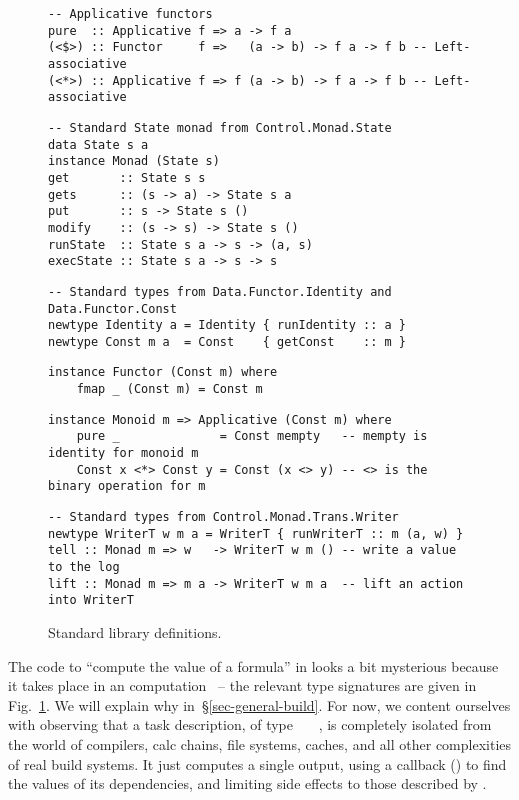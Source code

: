 \begin{figure}
\begin{verbatim}
-- Applicative functors
pure  :: Applicative f => a -> f a
(<$>) :: Functor     f =>   (a -> b) -> f a -> f b -- Left-associative
(<*>) :: Applicative f => f (a -> b) -> f a -> f b -- Left-associative
\end{verbatim}
\vspace{0.5mm}
\begin{verbatim}
-- Standard State monad from Control.Monad.State
data State s a
instance Monad (State s)
get       :: State s s
gets      :: (s -> a) -> State s a
put       :: s -> State s ()
modify    :: (s -> s) -> State s ()
runState  :: State s a -> s -> (a, s)
execState :: State s a -> s -> s
\end{verbatim}
\vspace{0.5mm}
\begin{verbatim}
-- Standard types from Data.Functor.Identity and Data.Functor.Const
newtype Identity a = Identity { runIdentity :: a }
newtype Const m a  = Const    { getConst    :: m }
\end{verbatim}
\vspace{0.5mm}
\begin{verbatim}
instance Functor (Const m) where
    fmap _ (Const m) = Const m
\end{verbatim}
\vspace{0.5mm}
\begin{verbatim}
instance Monoid m => Applicative (Const m) where
    pure _              = Const mempty   -- mempty is identity for monoid m
    Const x <*> Const y = Const (x <> y) -- <> is the binary operation for m
\end{verbatim}
\vspace{0.5mm}
\begin{verbatim}
-- Standard types from Control.Monad.Trans.Writer
newtype WriterT w m a = WriterT { runWriterT :: m (a, w) }
tell :: Monad m => w   -> WriterT w m () -- write a value to the log
lift :: Monad m => m a -> WriterT w m a  -- lift an action into WriterT
\end{verbatim}
\caption{Standard library definitions.}\label{fig-stdlib}
\end{figure}

The code to ``compute the value of a formula'' in  looks a bit
mysterious because it takes place in an 
computation~\cite{mcbride2008applicative} -- the relevant type signatures are
given in Fig.~\ref{fig-stdlib}. We will explain why in~\S\ref{sec-general-build}.
For now, we content ourselves with observing that a task description, of type
~~~, is completely isolated from the world of
compilers, calc chains, file systems, caches, and all other complexities of real
build systems. It just computes a single output,
using a callback () to find the values of its dependencies,
and limiting side effects to those described by .

